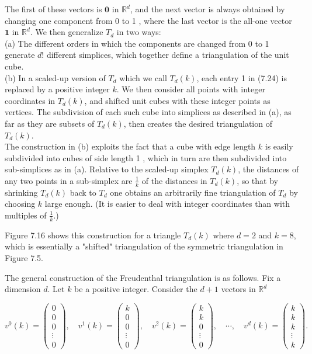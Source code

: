\documentclass[12pt]{article}
\begin{document}
The first of these vectors is $\mathbf{0}$ in $\mathbb{R}^{d}$, and the next vector is always obtained by changing one component from 0 to 1 , where the last vector is the all-one vector $\mathbf{1}$ in $\mathbb{R}^{d}$. We then generalize $T_{d}$ in two ways:\\
(a) The different orders in which the components are changed from 0 to 1 generate $d!$ different simplices, which together define a triangulation of the unit cube.\\
(b) In a scaled-up version of $T_{d}$ which we call $T_{d}(k)$, each entry 1 in (7.24) is replaced by a positive integer $k$. We then consider all points with integer coordinates in $T_{d}(k)$, and shifted unit cubes with these integer points as vertices. The subdivision of each such cube into simplices as described in (a), as far as they are subsets of $T_{d}(k)$, then creates the desired triangulation of $T_{d}(k)$.\\
The construction in (b) exploits the fact that a cube with edge length $k$ is easily subdivided into cubes of side length 1 , which in turn are then subdivided into sub-simplices as in (a). Relative to the scaled-up simplex $T_{d}(k)$, the distances of any two points in a sub-simplex are $\frac{1}{k}$ of the distances in $T_{d}(k)$, so that by shrinking $T_{d}(k)$ back to $T_{d}$ one obtains an arbitrarily fine triangulation of $T_{d}$ by choosing $k$ large enough. (It is easier to deal with integer coordinates than with multiples of $\frac{1}{k}$.)

Figure 7.16 shows this construction for a triangle $T_{d}(k)$ where $d=2$ and $k=8$, which is essentially a "shifted" triangulation of the symmetric triangulation in Figure 7.5.

The general construction of the Freudenthal triangulation is as follows. Fix a dimension $d$. Let $k$ be a positive integer. Consider the $d+1$ vectors in $\mathbb{R}^{d}$

\[
v^{0}(k)=\left(\begin{array}{c}
0  \tag{7.25}\\
0 \\
0 \\
\vdots \\
0
\end{array}\right), \quad v^{1}(k)=\left(\begin{array}{c}
k \\
0 \\
0 \\
\vdots \\
0
\end{array}\right), \quad v^{2}(k)=\left(\begin{array}{c}
k \\
k \\
0 \\
\vdots \\
0
\end{array}\right), \quad \cdots, \quad v^{d}(k)=\left(\begin{array}{c}
k \\
k \\
k \\
\vdots \\
k
\end{array}\right) .
\]
\end{document}
